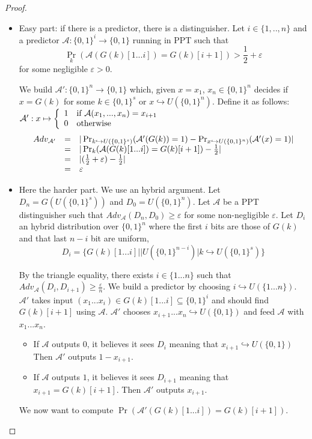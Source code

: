 \documentclass{article}
\newcommand{\A}{\mathcal{A}}
\renewcommand{\epsilon}{\varepsilon}
\begin{document}
\begin{proof}
\begin{itemize}
\item Easy part: if there is a predictor, there is a distinguisher. Let $i\in\{1,..,n\}$ and a predictor $\A:\{0,1\}^i\rightarrow\{0,1\}$ running in PPT such that 
\[\Pr_k(\A(G(k)[1...i])=G(k)[i+1])>\frac{1}{2}+\epsilon\]
for some negligible $\epsilon>0$.

We build $\A':\{0,1\}^n\rightarrow\{0,1\}$ which, given $x=x_1$, $x_n\in\{0,1\}^n$ decides if $x=G(k)$ for some $k\in\{0,1\}^s$ or $x\hookrightarrow U(\{0,1\}^n)$. Define it as follows: $\A':x\mapsto\left\{\begin{array}{r l}
1 & \text{if $\A(x_1,...,x_n)=x_{i+1}$}\\
0 & \text{otherwise}
\end{array}\right.$
\[\begin{array}{r c l}
Adv_{\A'} &=& |\Pr_{k\hookrightarrow U(\{0,1\}^s)}(\A'(G(k))=1)-\Pr_{x\hookrightarrow U(\{0,1\}^n)}(\A'(x)=1)|\\
&=& |\Pr_k(\A(G(k)[1...i])=G(k)[i+1]) - \frac{1}{2}|\\
&=& |(\frac{1}{2}+\epsilon)-\frac{1}{2}|\\
&=& \epsilon
\end{array}\]
\item Here the harder part. We use an hybrid argument. Let $D_n=G(U(\{0,1\}^s))$ and $D_0=U(\{0,1\}^n)$. Let $\A$ be a PPT distinguisher such that $Adv_\A(D_n,D_0)\geq\epsilon$ for some non-negligible $\epsilon$. Let $D_i$ an hybrid distribution over $\{0,1\}^n$ where the first $i$ bits are those of $G(k)$ and that last $n-i$ bit are uniform, \[D_i=\{G(k)[1...i]||U(\{0,1\}^{n-i})|k\hookrightarrow U(\{0,1\}^s)\}\]

By the triangle equality, there exists $i\in\{1...n\}$ such that $Adv_\A(D_i,D_{i+1})\geq\frac{\epsilon}{n}$. We build a predictor by choosing $i\hookrightarrow U(\{1...n\})$. $\A'$ takes input $(x_1...x_i)\in G(k)[1...i]\subseteq\{0,1\}^i$ and should find $G(k)[i+1]$ using $\A$.
$\A'$ chooses $x_{i+1}...x_n\hookrightarrow U(\{0,1\})$ and feed $\A$ with $x_1...x_n$.
\begin{itemize}
\item If $\A$ outputs $0$, it believes it sees $D_i$ meaning that $x_{i+1}\hookrightarrow U(\{0,1\})$ Then $\A'$ outputs $1-x_{i+1}$.
\item If $\A$ outputs $1$, it believes it sees $D_{i+1}$ meaning that $x_{i+1}=G(k)[i+1]$. Then $\A'$ outputs $x_{i+1}$.
\end{itemize}
We now want to compute $\Pr(\A'(G(k)[1...i])=G(k)[i+1])$.


\end{itemize}
\end{proof}
\end{document}
